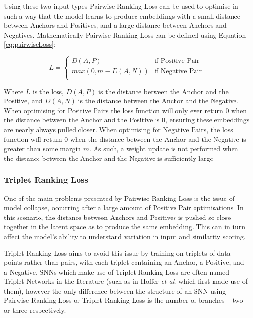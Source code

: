 Using these two input types Pairwise Ranking Loss can be used to optimise in such a way that the model learns to produce embeddings with a small distance between Anchors and Positives, and a large distance between Anchors and Negatives. Mathematically Pairwise Ranking Loss can be defined using Equation \ref{eq:pairwiseLoss}:

\begin{equation}
	\label{eq:pairwiseLoss}
	L =
		\begin{cases}
			D(A,P) & \text{if Positive Pair}\\
			max(0, m - D(A,N)) & \text{if Negative Pair}\\
		\end{cases}       
\end{equation}

\noindent Where $L$ is the loss, $D(A,P)$ is the distance between the Anchor and the Positive, and $D(A,N)$ is the distance between the Anchor and the Negative. When optimising for Positive Pairs the loss function will only ever return 0 when the distance between the Anchor and the Positive is 0, ensuring these embeddings are nearly always pulled closer. When optimising for Negative Pairs, the loss function will return 0 when the distance between the Anchor and the Negative is greater than some margin $m$. As such, a weight update is not performed when the distance between the Anchor and the Negative is sufficiently large.

\subsubsection{Triplet Ranking Loss}\label{ch:ID,sec:SNNBackground,sub:lossFunction,subsub:Triplet}

One of the main problems presented by Pairwise Ranking Loss is the issue of model collapse, occurring after a large amount of Positive Pair optimisations. In this scenario, the distance between Anchors and Positives is pushed so close together in the latent space as to produce the same embedding. This can in turn affect the model's ability to understand variation in input and similarity scoring. 

Triplet Ranking Loss aims to avoid this issue by training on triplets of data points rather than pairs, with each triplet containing an Anchor, a Positive, and a Negative. SNNs which make use of Triplet Ranking Loss are often named Triplet Networks in the literature (such as in Hoffer \textit{et al.} \cite{hoffer_deep_2018} which first made use of them), however the only difference between the structure of an SNN using Pairwise Ranking Loss or Triplet Ranking Loss is the number of branches -- two or three respectively. 

